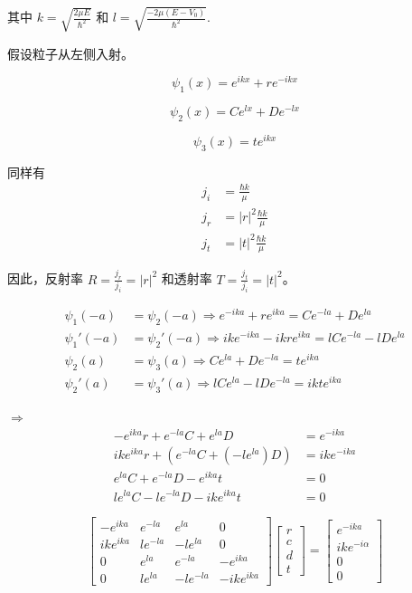 \documentclass[lang=cn,10pt]{elegantbook}
\begin{document}
\begin{enumerate}
	其中 $k = \sqrt{\frac{2\mu E}{\hbar^2}}$ 和 $l = \sqrt{\frac{-2\mu(E - V_0)}{\hbar^2}}$.
	
	假设粒子从左侧入射。
	
	\[
	\psi_1(x) = e^{ikx} + r e^{-ikx}
	\]
	
	\[
	\psi_2(x) = C e^{lx} + D e^{-lx}
	\]
	
	\[
	\psi_3(x) = t e^{ikx}
	\]
	
	同样有
	\begin{align*}
		j_i &= \frac{\hbar k}{\mu} \\
		j_r &= |r|^2 \frac{\hbar k}{\mu} \\
		j_t &= |t|^2 \frac{\hbar k}{\mu}
	\end{align*}
	
	因此，反射率 \( R = \frac{j_r}{j_i} = |r|^2 \) 和透射率 \( T = \frac{j_t}{j_i} = |t|^2 \)。
	
	\begin{align*}
		\psi_1(-a) &= \psi_2(-a) \Rightarrow e^{-ika} + r e^{ika} = C e^{-la} + D e^{la} \\
		\psi_1'(-a) &= \psi_2'(-a) \Rightarrow ike^{-ika} - ikr e^{ika} = l C e^{-la} - lDe^{la} \\
		\psi_2(a) &= \psi_3(a) \Rightarrow C e^{la} + D e^{-la} = te^{ika} \\
		\psi_2'(a) &= \psi_3'(a) \Rightarrow lC e^{la} - lDe^{-la} = ikte^{ika}
	\end{align*}
	
	$\Rightarrow$
	\begin{align*}
		-e^{ika} r + e^{-la} C + e^{la} D &= e^{-ika} \\
		ike^{ika} r + (e^{-la} C + (-le^{la}) D) &= ike^{-ika} \\
		e^{la} C + e^{-la} D - e^{ika} t &= 0 \\
		le^{la} C - le^{-la} D - ike^{ika} t &= 0
	\end{align*}
	
	\[
	\begin{bmatrix}
		-e^{ika} & e^{-la} & e^{la} & 0 \\
		ike^{ika} & le^{-la} & -le^{la} & 0 \\
		0 & e^{la} & e^{-la} & -e^{ika} \\
		0 & le^{la} & -le^{-la} & -ike^{ika}
	\end{bmatrix}
	\begin{bmatrix}
		r \\
		c \\
		d \\
		t
	\end{bmatrix}
	=
	\begin{bmatrix}
		e^{-ika} \\
		ike^{-i\alpha} \\
		0 \\
		0
	\end{bmatrix}
	\]
	

\end{enumerate}
\end{document}
